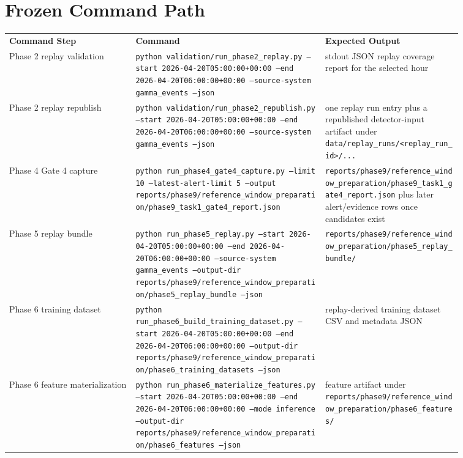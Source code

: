 \documentclass{article}
\begin{document}
\section*{Frozen Command Path}
\begin{longtable}{p{0.24\linewidth}p{0.36\linewidth}p{0.26\linewidth}}
\textbf{Command Step} & \textbf{Command} & \textbf{Expected Output} \\
Phase 2 replay validation &
\texttt{python validation/run\_phase2\_replay.py --start 2026-04-20T05:00:00+00:00 --end 2026-04-20T06:00:00+00:00 --source-system gamma\_events --json} &
stdout JSON replay coverage report for the selected hour \\
Phase 2 replay republish &
\texttt{python validation/run\_phase2\_republish.py --start 2026-04-20T05:00:00+00:00 --end 2026-04-20T06:00:00+00:00 --source-system gamma\_events --json} &
one replay run entry plus a republished detector-input artifact under \texttt{data/replay\_runs/<replay\_run\_id>/...} \\
Phase 4 Gate 4 capture &
\texttt{python run\_phase4\_gate4\_capture.py --limit 10 --latest-alert-limit 5 --output reports/phase9/reference\_window\_preparation/phase9\_task1\_gate4\_report.json} &
\texttt{reports/phase9/reference\_window\_preparation/phase9\_task1\_gate4\_report.json} plus later alert/evidence rows once candidates exist \\
Phase 5 replay bundle &
\texttt{python run\_phase5\_replay.py --start 2026-04-20T05:00:00+00:00 --end 2026-04-20T06:00:00+00:00 --source-system gamma\_events --output-dir reports/phase9/reference\_window\_preparation/phase5\_replay\_bundle --json} &
\texttt{reports/phase9/reference\_window\_preparation/phase5\_replay\_bundle/} \\
Phase 6 training dataset &
\texttt{python run\_phase6\_build\_training\_dataset.py --start 2026-04-20T05:00:00+00:00 --end 2026-04-20T06:00:00+00:00 --output-dir reports/phase9/reference\_window\_preparation/phase6\_training\_datasets --json} &
replay-derived training dataset CSV and metadata JSON \\
Phase 6 feature materialization &
\texttt{python run\_phase6\_materialize\_features.py --start 2026-04-20T05:00:00+00:00 --end 2026-04-20T06:00:00+00:00 --mode inference --output-dir reports/phase9/reference\_window\_preparation/phase6\_features --json} &
feature artifact under \texttt{reports/phase9/reference\_window\_preparation/phase6\_features/} \\
\end{longtable}
\end{document}
